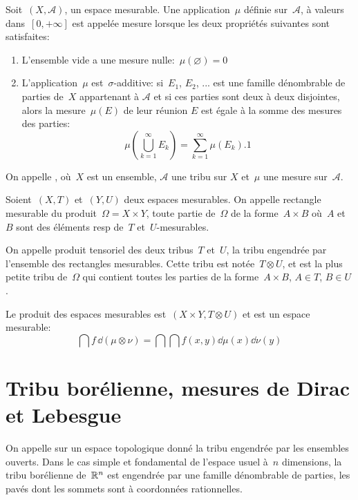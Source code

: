 \begin{definition}[Mesure]
\medskip
Soit~$(X,\mathcal{A})$, un espace mesurable.
Une application~$\mu$ définie sur~$\mathcal{A}$, à valeurs dans~$[0,+\infty]$ est appelée
mesure lorsque les deux propriétés suivantes sont satisfaites:
\begin{enumerate}
  \item L'ensemble vide a une mesure nulle:~$\mu\left(\varnothing\right)=0$
  \item L'application~$\mu$ est~$\sigma$-additive:
si~$E_1$, $E_2$, ... est une famille dénombrable de parties de~$X$ appartenant à
$\mathcal{A}$ et si ces parties sont deux à deux disjointes, alors la mesure~$\mu(E)$ de leur réunion
$E$ est égale à la somme des mesures des parties:
\begin{equation}
\mu\left(\bigcup_{k=1}^{\infty}E_{k}\right)=\sum_{k=1}^{\infty}\mu(E_{k}).1
\end{equation}
\end{enumerate}
\end{definition}

On appelle ,
 où~$X$ est un ensemble, $\mathcal{A}$ une tribu sur
$X$ et~$\mu$ une mesure sur~$\mathcal{A}$.

\medskip
{}
Soient~$(X,T)$ et~$(Y,U)$ deux espaces mesurables.
On appelle rectangle mesurable du produit~$\Omega=X\times Y$, toute partie de~$\Omega$
de la forme~$A\times B$ où~$A$ et~$B$ sont des éléments resp de~$T$ et~$U$-mesurables.

On appelle produit tensoriel des deux tribus~$T$ et~$U$, la tribu
engendrée par l'ensemble des rectangles mesurables.
Cette tribu est notée~$T \otimes U$, et est la plus petite tribu de~$\Omega$ qui contient
toutes les parties de la forme~$A\times B$, $A\in T$, $B\in U$.

Le produit des espaces mesurables est~$(X\times Y, T \otimes U)$ et est un espace mesurable:
\begin{equation}
\dint f\,\dd(\mu \otimes \nu) = \dint\dint f(x,y) \dd\mu(x)\dd\nu(y)
\end{equation}

\medskip
\section{Tribu borélienne, mesures de Dirac et Lebesgue}

\begin{definition}
On appelle  sur un espace topologique donné la tribu engendrée par les
ensembles ouverts.
Dans le cas simple et fondamental de l'espace usuel à~$n$ dimensions, la tribu borélienne de~$\mathbb R^n$
est engendrée par une famille dénombrable de parties, les pavés dont les sommets sont à
coordonnées rationnelles.
\end{definition}

